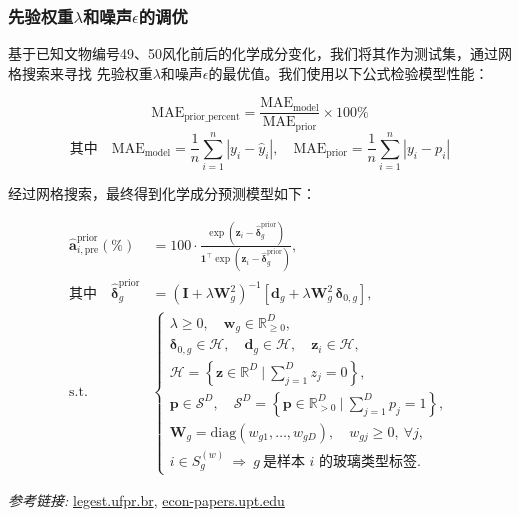 \documentclass[withoutpreface,bwprint]{cumcmthesis}
\begin{document}
\subsubsection{先验权重$\lambda$和噪声$\epsilon$的调优}

基于已知文物编号49、50风化前后的化学成分变化，我们将其作为测试集，通过网格搜索来寻找
先验权重$\lambda$和噪声$\epsilon$的最优值。我们使用以下公式检验模型性能：

\[
	\text{MAE}_{\text{prior\_percent}} = \frac{\text{MAE}_{\text{model}}}{\text{MAE}_{\text{prior}}} \times 100\%
\]
\[
	\text{其中}\quad
	\text{MAE}_{\text{model}} = \frac{1}{n} \sum_{i=1}^{n} \left| y_i - \hat{y}_i \right|, \quad
	\text{MAE}_{\text{prior}} = \frac{1}{n} \sum_{i=1}^{n} \left| y_i - p_i \right|
\]

经过网格搜索，最终得到化学成分预测模型如下：

\begin{align}
\widehat{\mathbf{a}}_{i,\mathrm{pre}}^{\mathrm{prior}} (\%)
&= 100 \cdot 
\frac{\exp\!\left( \mathbf{z}_i - \widehat{\boldsymbol\delta}_g^{\mathrm{prior}} \right)}
{\mathbf{1}^\top \exp\!\left( \mathbf{z}_i - \widehat{\boldsymbol\delta}_g^{\mathrm{prior}} \right)},
\\
\text{其中} \quad
\widehat{\boldsymbol\delta}_g^{\mathrm{prior}}
&= \left( \mathbf{I} + \lambda \mathbf{W}_g^2 \right)^{-1} 
\left[ \mathbf{d}_g + \lambda \mathbf{W}_g^2 \, \boldsymbol{\delta}_{0,g} \right],
\\
\text{s.t.} \quad &
\begin{cases}
\lambda \ge 0, \quad \mathbf{w}_g \in \mathbb{R}_{\ge 0}^D, \\[0.3em]
\boldsymbol{\delta}_{0,g} \in \mathcal{H}, \quad \mathbf{d}_g \in \mathcal{H}, \quad \mathbf{z}_i \in \mathcal{H}, \\[0.3em]
\mathcal{H} = \left\{ \mathbf{z} \in \mathbb{R}^D \ \bigg| \ \sum_{j=1}^D z_j = 0 \right\}, \\[0.3em]
\mathbf{p} \in \mathcal{S}^D, \quad 
\mathcal{S}^D = \left\{ \mathbf{p} \in \mathbb{R}_{>0}^D \ \bigg| \ \sum_{j=1}^D p_j = 1 \right\}, \\[0.3em]
\mathbf{W}_g = \mathrm{diag}(w_{g1}, \dots, w_{gD}), \quad w_{gj} \ge 0, \ \forall j, \\[0.3em]
i \in S_g^{(w)} \ \Rightarrow \ g \ \text{是样本 $i$ 的玻璃类型标签}.
\end{cases}
\end{align}


\smallskip
\noindent
\textit{参考链接:} \url{legest.ufpr.br}, \url{econ-papers.upt.edu}
\end{document}
